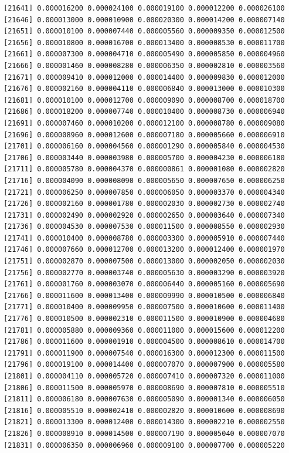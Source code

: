 \documentclass[]{article}
\begin{document}
\begin{verbatim}
[21641] 0.000016200 0.000024100 0.000019100 0.000012200 0.000026100
[21646] 0.000013000 0.000010900 0.000020300 0.000014200 0.000007140
[21651] 0.000010100 0.000007440 0.000005560 0.000009350 0.000012500
[21656] 0.000010800 0.000016700 0.000013400 0.000008530 0.000011700
[21661] 0.000007300 0.000004710 0.000005490 0.000005850 0.000004960
[21666] 0.000001460 0.000008280 0.000006350 0.000002810 0.000003560
[21671] 0.000009410 0.000012000 0.000014400 0.000009830 0.000012000
[21676] 0.000002160 0.000004110 0.000006840 0.000013000 0.000010300
[21681] 0.000010100 0.000012700 0.000009090 0.000008700 0.000018700
[21686] 0.000018200 0.000007740 0.000010400 0.000008730 0.000006940
[21691] 0.000007460 0.000010200 0.000012100 0.000008780 0.000009080
[21696] 0.000008960 0.000012600 0.000007180 0.000005660 0.000006910
[21701] 0.000006160 0.000004560 0.000001290 0.000005840 0.000004530
[21706] 0.000003440 0.000003980 0.000005700 0.000004230 0.000006180
[21711] 0.000005780 0.000004370 0.000000861 0.000001080 0.000002820
[21716] 0.000004090 0.000008090 0.000005650 0.000007650 0.000006250
[21721] 0.000006250 0.000007850 0.000006050 0.000003370 0.000004340
[21726] 0.000002160 0.000001780 0.000002030 0.000002730 0.000002740
[21731] 0.000002490 0.000002920 0.000002650 0.000003640 0.000007340
[21736] 0.000004530 0.000007530 0.000011500 0.000008550 0.000002930
[21741] 0.000010400 0.000008780 0.000003300 0.000005910 0.000007440
[21746] 0.000007660 0.000012700 0.000013200 0.000012400 0.000001970
[21751] 0.000002870 0.000007500 0.000013000 0.000002050 0.000002030
[21756] 0.000002770 0.000003740 0.000005630 0.000003290 0.000003920
[21761] 0.000001760 0.000003070 0.000006440 0.000005160 0.000005690
[21766] 0.000011600 0.000013400 0.000009990 0.000010500 0.000006840
[21771] 0.000010400 0.000009950 0.000007500 0.000010600 0.000011400
[21776] 0.000010500 0.000002310 0.000011500 0.000010900 0.000004680
[21781] 0.000005880 0.000009360 0.000011000 0.000015600 0.000012200
[21786] 0.000011600 0.000001910 0.000004500 0.000008610 0.000014700
[21791] 0.000011900 0.000007540 0.000016300 0.000012300 0.000011500
[21796] 0.000019100 0.000014400 0.000007070 0.000007900 0.000005580
[21801] 0.000004110 0.000005720 0.000007410 0.000007320 0.000011000
[21806] 0.000011500 0.000005970 0.000008690 0.000007810 0.000005510
[21811] 0.000006180 0.000007630 0.000005090 0.000001340 0.000006050
[21816] 0.000005510 0.000002410 0.000002820 0.000010600 0.000008690
[21821] 0.000013300 0.000012400 0.000014300 0.000002210 0.000002550
[21826] 0.000008910 0.000014500 0.000007190 0.000005040 0.000007070
[21831] 0.000006350 0.000006960 0.000009100 0.000007700 0.000005220

\end{verbatim}
\end{document}
